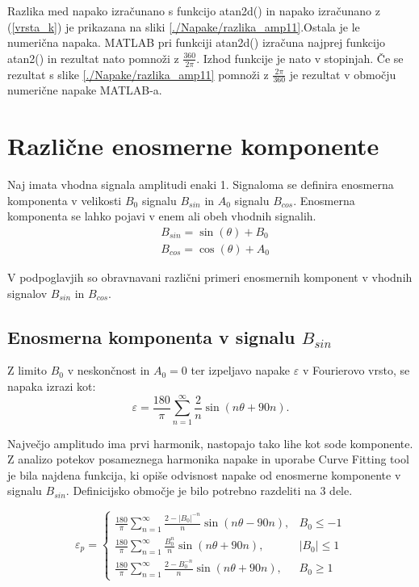 Razlika med napako izračunano s funkcijo atan2d() in napako izračunano z (\ref{vrsta_k}) je prikazana na sliki \ref{./Napake/razlika_amp11}.Ostala je le numerična napaka. MATLAB pri funkciji atan2d() izračuna najprej funkcijo
atan2() in  rezultat nato pomnoži z $\frac{360}{2\pi}$. Izhod funkcije je nato v stopinjah. Če se rezultat s slike \ref{./Napake/razlika_amp11} pomnoži z $\frac{2\pi}{360}$ je rezultat v območju numerične napake MATLAB-a.
\newpage
\section{Različne enosmerne komponente}
Naj imata vhodna signala amplitudi enaki 1. Signaloma se definira enosmerna komponenta v velikosti $B_0$ signalu $B_{sin}$ in $A_0$ signalu $B_{cos}$. Enosmerna komponenta se lahko pojavi v enem ali obeh vhodnih signalih.
\begin{eqnarray}
\label{equ:def_sin_ama}
&B_{sin} = \sin(\theta) + B_0\\
\label{equ:def_cos_amp}
&B_{cos} =\cos(\theta) +A_0
\end{eqnarray}

V podpoglavjih so obravnavani različni primeri enosmernih komponent v vhodnih signalov $B_{sin}$ in $B_{cos}$.
\subsection{Enosmerna komponenta v signalu $B_{sin}$}

Z limito $B_0$ v neskončnost in $A_0 = 0$ ter izpeljavo napake $\varepsilon$ v Fourierovo vrsto, se napaka izrazi kot:
\begin{equation}
\varepsilon = \frac{180}{\pi}\sum_{n=1}^{\infty}\frac{2}{n} \sin (n \theta + 90 n).
\end{equation}

Največjo amplitudo ima prvi harmonik, nastopajo tako lihe kot sode komponente.
Z analizo potekov posameznega harmonika napake in uporabe Curve Fitting tool je bila najdena funkcija, ki opiše odvisnost napake od enosmerne komponente v signalu $B_{sin}$. Definicijsko območje je bilo potrebno
razdeliti na 3 dele.

\begin{equation}
\label{vrsta_sinoff}
\varepsilon_p=
\begin{cases}
\frac{180}{\pi}\sum_{n=1}^{\infty}\frac{2-|B_0|^{-n}}{n} \sin (n \theta -  90 n), & B_0\leq -1 \\
\frac{180}{\pi}\sum_{n=1}^{\infty}\frac{B_0^n}{n} \sin (n \theta + 90 n), & |B_0|\leq 1 \\
\frac{180}{\pi}\sum_{n=1}^{\infty}\frac{2-B_0^{-n}}{n} \sin (n \theta + 90 n), & B_0\geq 1
\end{cases}
\end{equation}
\newpage
